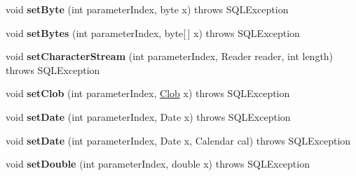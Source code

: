 \begin{DoxyCompactItemize}
void {\bfseries set\+Byte} (int parameter\+Index, byte x)  throws S\+Q\+L\+Exception 
\item 
\mbox{\label{classcom_1_1mysql_1_1cj_1_1jdbc_1_1_prepared_statement_wrapper_a5b5770d081da9baf8ca33f3567f69905}} 
void {\bfseries set\+Bytes} (int parameter\+Index, byte\mbox{[}$\,$\mbox{]} x)  throws S\+Q\+L\+Exception 
\item 
\mbox{\label{classcom_1_1mysql_1_1cj_1_1jdbc_1_1_prepared_statement_wrapper_acee49f9b94421c746c1f42a6ec889c99}} 
void {\bfseries set\+Character\+Stream} (int parameter\+Index, Reader reader, int length)  throws S\+Q\+L\+Exception 
\item 
\mbox{\label{classcom_1_1mysql_1_1cj_1_1jdbc_1_1_prepared_statement_wrapper_aa1ff112e49bbfce983bbade82700b654}} 
void {\bfseries set\+Clob} (int parameter\+Index, \mbox{\hyperlink{classcom_1_1mysql_1_1cj_1_1jdbc_1_1_clob}{Clob}} x)  throws S\+Q\+L\+Exception 
\item 
\mbox{\label{classcom_1_1mysql_1_1cj_1_1jdbc_1_1_prepared_statement_wrapper_ade7a75bb5fbec4288b9ec3dc88bef2a0}} 
void {\bfseries set\+Date} (int parameter\+Index, Date x)  throws S\+Q\+L\+Exception 
\item 
\mbox{\label{classcom_1_1mysql_1_1cj_1_1jdbc_1_1_prepared_statement_wrapper_a87fc86f44f377ee29216f0d2da15f9f0}} 
void {\bfseries set\+Date} (int parameter\+Index, Date x, Calendar cal)  throws S\+Q\+L\+Exception 
\item 
\mbox{\label{classcom_1_1mysql_1_1cj_1_1jdbc_1_1_prepared_statement_wrapper_adbfd679f308d47e65f17e2901889befc}} 
void {\bfseries set\+Double} (int parameter\+Index, double x)  throws S\+Q\+L\+Exception 
\item 
\mbox{\label{classcom_1_1mysql_1_1cj_1_1jdbc_1_1_prepared_statement_wrapper_a0aa73e684f25bdcd9ddcf5ec20ca949c}} 

\end{DoxyCompactItemize}
